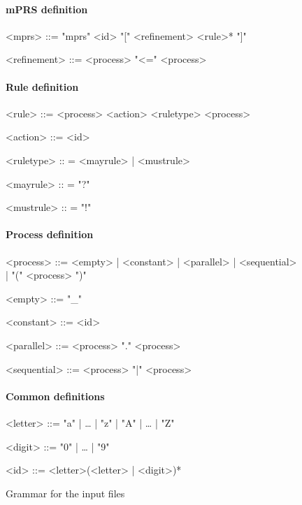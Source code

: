 \begin{figure}
\paragraph{mPRS definition}
\begin{grammar}
<mprs> ::= "mprs" <id> "[" <refinement> <rule>* "]"

<refinement> ::= <process> "<=" <process>

\end{grammar}

\paragraph{Rule definition}
\begin{grammar}
<rule> ::= <process> <action> <ruletype> <process>

<action> ::= <id>

<ruletype> :: = <mayrule> | <mustrule>

<mayrule> :: = "?"

<mustrule> :: = "!"
\end{grammar}

\paragraph{Process definition}
\begin{grammar}
<process> ::= <empty> | <constant> | <parallel> | <sequential> | "(" <process> ")"

<empty> ::= "_"

<constant> ::= <id>

<parallel> ::= <process> "." <process>

<sequential> ::= <process> "|" <process>
\end{grammar}

\paragraph{Common definitions}
\begin{grammar}
<letter> ::= "a" | … | "z" | "A" | … | "Z"

<digit> ::= "0" | …  | "9"

<id> ::= <letter>(<letter> | <digit>)*
\end{grammar}
\label{fig:grammar}
\caption{Grammar for the input files}
\end{figure}

\newpage %

